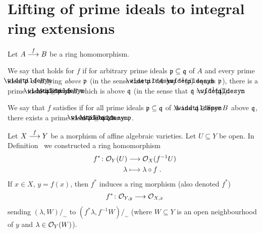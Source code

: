 \documentclass[a4paper,parskip=half,numbers=enddot, DIV=12]{scrreprt}
\begin{document}
\section{Lifting of prime ideals to integral ring extensions}
	\begin{defi}
		Let $A\morphism[f]B$ be a ring homomorphism.
		\begin{alphanumerate}
			\item We say that  holds for $f$ if for arbitrary prime ideals $\mathfrak{p}\subseteq \mathfrak{q}$ of $A$ and every prime ideal $\snake \pp$ of $B$ lying \emph{above} $\mathfrak{p}$ (in the sense that $\snake\pp\cap A=f^{-1}(\snake \pp)$ equals $\mathfrak{p}$), there is a prime ideal $\snake \qq\supseteq\snake \pp$ of $B$ which is above $\mathfrak{q}$ (in the sense that $\qq=f^{-1}(\snake\qq)$).
			\item We say that $f$ satisfies  if for all prime ideals $\mathfrak{p}\subseteq\mathfrak{q}$ of $A$ and $\snake \qq\in\Spec B$ above $\mathfrak{q}$, there exists a prime ideal $\snake \pp\subseteq\snake\qq$ above $\mathfrak{p}$.
		\end{alphanumerate}
	\end{defi}
		Let $X\morphism[f]Y$ be a morphism of affine algebraic varieties. Let $U\subseteq Y$ be open. In Definition~ we constructed a ring homomorphism
		\begin{align*}
			f^*\colon\mathcal{O}_Y(U)&\longrightarrow\mathcal{O}_X(f^{-1}U)\\
			\lambda&\longmapsto\lambda\circ f\;.
		\end{align*}
		If $x\in X$, $y=f(x)$, then $f^*$ induces a ring morphism (also denoted $f^*$) 
		\begin{align*}
			 f^*\colon\Oo_{Y,y}\morphism \Oo_{X,x} 
		\end{align*}
		sending $(\lambda,W)/_\sim$ to $(f^*\lambda,f^{-1}W)/_\sim$ (where $W\subseteq Y$ is an open neighbourhood of $y$ and $\lambda\in\mathcal{O}_Y(W)$).
\end{document}
